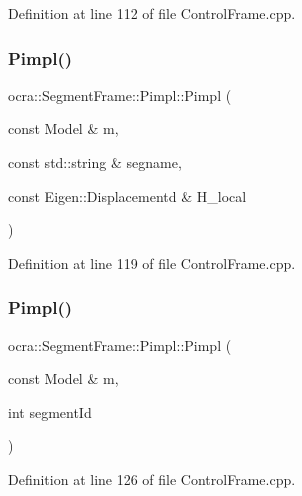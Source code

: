 Definition at line 112 of file Control\+Frame.\+cpp.

\hypertarget{structocra_1_1SegmentFrame_1_1Pimpl_a419d287d9da1582ff94dd9c3ab539f2b}{}\label{structocra_1_1SegmentFrame_1_1Pimpl_a419d287d9da1582ff94dd9c3ab539f2b} 
\subsubsection{\texorpdfstring{Pimpl()}{Pimpl()}\hspace{0.1cm}{\footnotesize\ttfamily [2/4]}}
{\footnotesize\ttfamily ocra\+::\+Segment\+Frame\+::\+Pimpl\+::\+Pimpl (\begin{DoxyParamCaption}\item[{const Model \&}]{m,  }\item[{const std\+::string \&}]{segname,  }\item[{const Eigen\+::\+Displacementd \&}]{H\+\_\+local }\end{DoxyParamCaption})\hspace{0.3cm}{\ttfamily [inline]}}



Definition at line 119 of file Control\+Frame.\+cpp.

\hypertarget{structocra_1_1SegmentFrame_1_1Pimpl_a0de56572f8a4d14450c37bd71e432f2e}{}\label{structocra_1_1SegmentFrame_1_1Pimpl_a0de56572f8a4d14450c37bd71e432f2e} 
\subsubsection{\texorpdfstring{Pimpl()}{Pimpl()}\hspace{0.1cm}{\footnotesize\ttfamily [3/4]}}
{\footnotesize\ttfamily ocra\+::\+Segment\+Frame\+::\+Pimpl\+::\+Pimpl (\begin{DoxyParamCaption}\item[{const Model \&}]{m,  }\item[{int}]{segment\+Id }\end{DoxyParamCaption})\hspace{0.3cm}{\ttfamily [inline]}}



Definition at line 126 of file Control\+Frame.\+cpp.

